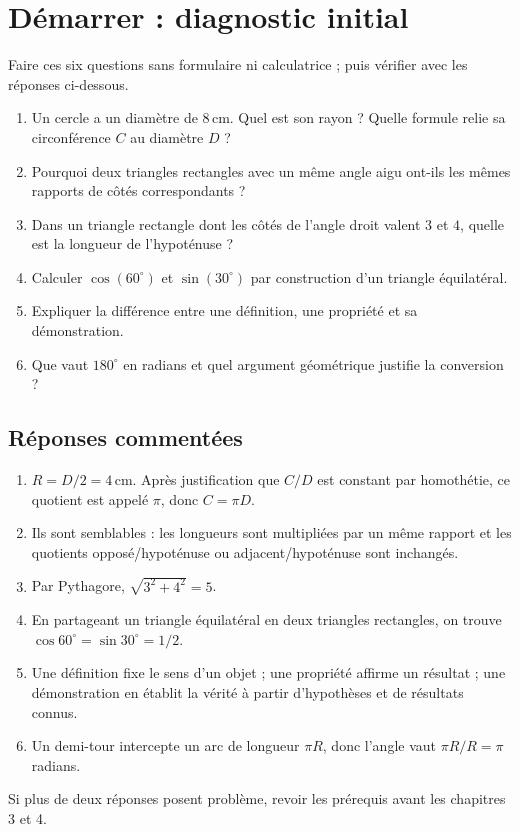 \documentclass[11pt,a4paper,oneside]{book}
\begin{document}
\chapter{Démarrer : diagnostic initial}
Faire ces six questions sans formulaire ni calculatrice ; puis vérifier avec les réponses ci-dessous.
\begin{enumerate}
\item Un cercle a un diamètre de $8\,\mathrm{cm}$. Quel est son rayon ? Quelle formule relie sa circonférence $C$ au diamètre $D$ ?
\item Pourquoi deux triangles rectangles avec un même angle aigu ont-ils les mêmes rapports de côtés correspondants ?
\item Dans un triangle rectangle dont les côtés de l'angle droit valent $3$ et $4$, quelle est la longueur de l'hypoténuse ?
\item Calculer $\cos(60^\circ)$ et $\sin(30^\circ)$ par construction d'un triangle équilatéral.
\item Expliquer la différence entre une définition, une propriété et sa démonstration.
\item Que vaut $180^\circ$ en radians et quel argument géométrique justifie la conversion ?
\end{enumerate}
\section{Réponses commentées}
\begin{enumerate}
\item $R=D/2=4\,\mathrm{cm}$. Après justification que $C/D$ est constant par homothétie, ce quotient est appelé $\pi$, donc $C=\pi D$.
\item Ils sont semblables : les longueurs sont multipliées par un même rapport et les quotients opposé/hypoténuse ou adjacent/hypoténuse sont inchangés.
\item Par Pythagore, $\sqrt{3^2+4^2}=5$.
\item En partageant un triangle équilatéral en deux triangles rectangles, on trouve $\cos60^\circ=\sin30^\circ=1/2$.
\item Une définition fixe le sens d'un objet ; une propriété affirme un résultat ; une démonstration en établit la vérité à partir d'hypothèses et de résultats connus.
\item Un demi-tour intercepte un arc de longueur $\pi R$, donc l'angle vaut $\pi R/R=\pi$ radians.
\end{enumerate}
Si plus de deux réponses posent problème, revoir les prérequis avant les chapitres 3 et 4.
\end{document}
